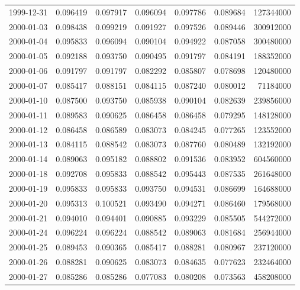 \begin{tabular}{lrrrrrr}
1999-12-31 &    0.096419 &    0.097917 &    0.096094 &    0.097786 &    0.089684 &   127344000 \\
2000-01-03 &    0.098438 &    0.099219 &    0.091927 &    0.097526 &    0.089446 &   300912000 \\
2000-01-04 &    0.095833 &    0.096094 &    0.090104 &    0.094922 &    0.087058 &   300480000 \\
2000-01-05 &    0.092188 &    0.093750 &    0.090495 &    0.091797 &    0.084191 &   188352000 \\
2000-01-06 &    0.091797 &    0.091797 &    0.082292 &    0.085807 &    0.078698 &   120480000 \\
2000-01-07 &    0.085417 &    0.088151 &    0.084115 &    0.087240 &    0.080012 &    71184000 \\
2000-01-10 &    0.087500 &    0.093750 &    0.085938 &    0.090104 &    0.082639 &   239856000 \\
2000-01-11 &    0.089583 &    0.090625 &    0.086458 &    0.086458 &    0.079295 &   148128000 \\
2000-01-12 &    0.086458 &    0.086589 &    0.083073 &    0.084245 &    0.077265 &   123552000 \\
2000-01-13 &    0.084115 &    0.088542 &    0.083073 &    0.087760 &    0.080489 &   132192000 \\
2000-01-14 &    0.089063 &    0.095182 &    0.088802 &    0.091536 &    0.083952 &   604560000 \\
2000-01-18 &    0.092708 &    0.095833 &    0.088542 &    0.095443 &    0.087535 &   261648000 \\
2000-01-19 &    0.095833 &    0.095833 &    0.093750 &    0.094531 &    0.086699 &   164688000 \\
2000-01-20 &    0.095313 &    0.100521 &    0.093490 &    0.094271 &    0.086460 &   179568000 \\
2000-01-21 &    0.094010 &    0.094401 &    0.090885 &    0.093229 &    0.085505 &   544272000 \\
2000-01-24 &    0.096224 &    0.096224 &    0.088542 &    0.089063 &    0.081684 &   256944000 \\
2000-01-25 &    0.089453 &    0.090365 &    0.085417 &    0.088281 &    0.080967 &   237120000 \\
2000-01-26 &    0.088281 &    0.090625 &    0.083073 &    0.084635 &    0.077623 &   232464000 \\
2000-01-27 &    0.085286 &    0.085286 &    0.077083 &    0.080208 &    0.073563 &   458208000 \\

\end{tabular}

